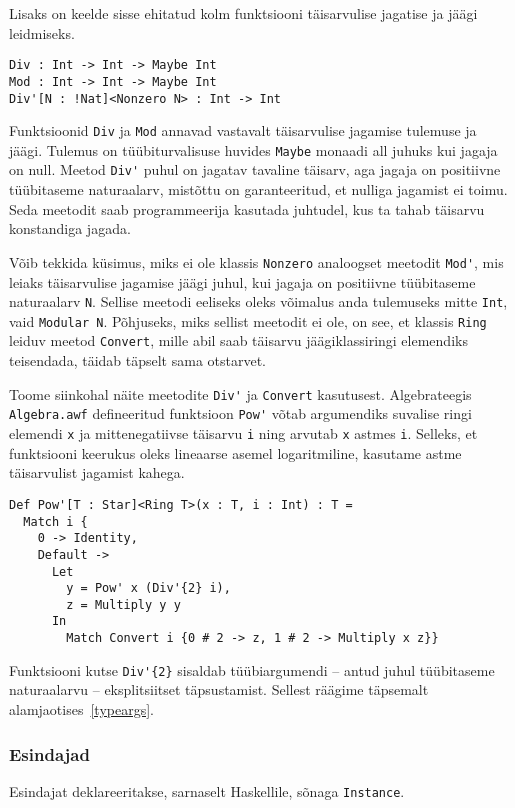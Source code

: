 \documentclass[12pt]{article}
\begin{document}
        Lisaks on keelde sisse ehitatud kolm funktsiooni täisarvulise jagatise ja jäägi leidmiseks.

        \begin{verbatim}Div : Int -> Int -> Maybe Int
Mod : Int -> Int -> Maybe Int
Div'[N : !Nat]<Nonzero N> : Int -> Int\end{verbatim}

        Funktsioonid \verb!Div! ja \verb!Mod! annavad vastavalt täisarvulise jagamise tulemuse ja jäägi. Tulemus on tüübiturvalisuse huvides \verb!Maybe! monaadi all juhuks kui jagaja on null. Meetod \verb!Div'! puhul on jagatav tavaline täisarv, aga jagaja on positiivne tüübitaseme naturaalarv, mistõttu on garanteeritud, et nulliga jagamist ei toimu. Seda meetodit saab programmeerija kasutada juhtudel, kus ta tahab täisarvu konstandiga jagada.

        Võib tekkida küsimus, miks ei ole klassis \verb!Nonzero! analoogset meetodit \verb!Mod'!, mis leiaks täisarvulise jagamise jäägi juhul, kui jagaja on positiivne tüübitaseme naturaalarv \verb!N!. Sellise meetodi eeliseks oleks võimalus anda tulemuseks mitte \verb!Int!, vaid \verb!Modular N!. Põhjuseks, miks sellist meetodit ei ole, on see, et klassis \verb!Ring! leiduv meetod \verb!Convert!, mille abil saab täisarvu jäägiklassiringi elemendiks teisendada, täidab täpselt sama otstarvet.

        Toome siinkohal näite meetodite \verb!Div'! ja \verb!Convert! kasutusest. Algebrateegis \verb!Algebra.awf! defineeritud funktsioon \verb!Pow'! võtab argumendiks suvalise ringi elemendi \verb!x! ja mittenegatiivse täisarvu \verb!i! ning arvutab \verb!x! astmes \verb!i!. Selleks, et funktsiooni keerukus oleks lineaarse asemel logaritmiline, kasutame astme täisarvulist jagamist kahega.

        \begin{verbatim}Def Pow'[T : Star]<Ring T>(x : T, i : Int) : T =
  Match i {
    0 -> Identity,
    Default ->
      Let
        y = Pow' x (Div'{2} i),
        z = Multiply y y
      In
        Match Convert i {0 # 2 -> z, 1 # 2 -> Multiply x z}}\end{verbatim}

        Funktsiooni kutse \verb!Div'{2}! sisaldab tüübiargumendi -- antud juhul tüübitaseme naturaalarvu -- eksplitsiitset täpsustamist. Sellest räägime täpsemalt alamjaotises~\ref{typeargs}.
      \subsubsection{Esindajad}
        Esindajat deklareeritakse, sarnaselt Haskellile, sõnaga \verb!Instance!.
\end{document}

